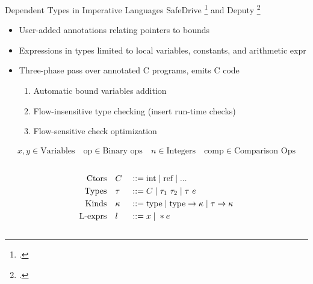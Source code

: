 \documentclass[aspectratio=169]{beamer}
\begin{document}
\begin{frame}{Dependent Types in Imperative Languages}
SafeDrive \footcite{zhou_safedrive:_2006} and Deputy \footcite{condit_dependent_2007}
\vspace{-0.1in}
    \begin{itemize}
        \item User-added annotations relating pointers to bounds
        \item Expressions in types limited to local variables, constants, and arithmetic expr
        \item Three-phase pass over annotated C programs, emits C code
            \begin{enumerate}
                \item Automatic bound variables addition
                \item Flow-insensitive type checking (insert run-time checks)
                \item Flow-sensitive check optimization
            \end{enumerate}
    \end{itemize}
\vspace{-0.3in}

\footnotesize{
\begin{gather*}
    x,y \in \text{Variables}
    \quad
    \text{op} \in \text{Binary ops}
    \quad
    n \in \text{Integers}
    \quad
    \text{comp} \in \text{Comparison Ops}
\end{gather*}

\vspace{-0.3in}

\begin{columns}[T]
\begin{column}{0.45\textwidth}
\begin{alignat*}{2}
\text{Ctors}\quad &C &&::= \text{int} \altm \text{ref} \altm ...
\\
\text{Types}\quad &\tau &&::= C \altm \tau_1 \ \tau_2 \altm \tau\ e
\\
\text{Kinds}\quad & \kappa &&::= \text{type} \altm \text{type} \rightarrow \kappa \altm \tau \rightarrow \kappa
\\
\text{L-exprs} \quad &l &&::= x \altm *e
\end{alignat*}
\end{column}


\end{columns}}
\end{frame}
\end{document}
